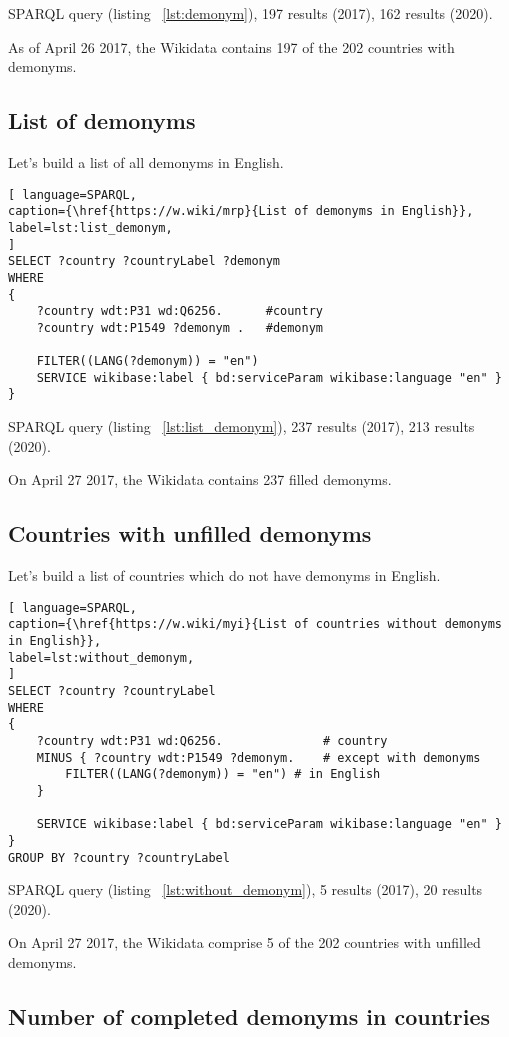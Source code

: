 SPARQL query (listing ~\ref{lst:demonym}), 197 results (2017), 162 results (2020).

As of April 26 2017, the Wikidata contains 197 of the 202 countries with demonyms.

\subsection{List of demonyms}

Let's build a list of all demonyms in English.

\begin{lstlisting}[ language=SPARQL, 
caption={\href{https://w.wiki/mrp}{List of demonyms in English}},
label=lst:list_demonym, 
]
SELECT ?country ?countryLabel ?demonym
WHERE
{
	?country wdt:P31 wd:Q6256.      #country
	?country wdt:P1549 ?demonym .   #demonym
	
	FILTER((LANG(?demonym)) = "en")
	SERVICE wikibase:label { bd:serviceParam wikibase:language "en" }
}
\end{lstlisting}

SPARQL query (listing ~\ref{lst:list_demonym}), 237 results (2017), 213 results (2020).

On April 27 2017, the Wikidata contains 237 filled demonyms.

\subsection{Countries with unfilled demonyms}

Let's build a list of countries which do not have demonyms in English.

\begin{lstlisting}[ language=SPARQL, 
caption={\href{https://w.wiki/myi}{List of countries without demonyms in English}},
label=lst:without_demonym, 
]
SELECT ?country ?countryLabel 
WHERE
{
	?country wdt:P31 wd:Q6256.              # country
	MINUS { ?country wdt:P1549 ?demonym.    # except with demonyms
		FILTER((LANG(?demonym)) = "en") # in English
	}    
	
	SERVICE wikibase:label { bd:serviceParam wikibase:language "en" }
}
GROUP BY ?country ?countryLabel
\end{lstlisting}

SPARQL query (listing ~\ref{lst:without_demonym}), 5 results (2017), 20 results (2020).

On April 27 2017, the Wikidata comprise 5 of the 202 countries with unfilled demonyms.

\subsection{Number of completed demonyms in countries}

